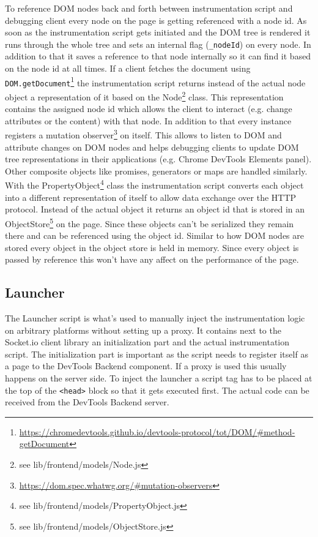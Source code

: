 To reference DOM nodes back and forth between instrumentation script and debugging client every node on the page is getting referenced with a node id. As soon as the instrumentation script gets initiated and the DOM tree is rendered it runs through the whole tree and sets an internal flag (\texttt{\_nodeId}) on every node. In addition to that it saves a reference to that node internally so it can find it based on the node id at all times. If a client fetches the document using \texttt{DOM.getDocument}\footnote{\url{https://chromedevtools.github.io/devtools-protocol/tot/DOM/\#method-getDocument}} the instrumentation script returns instead of the actual node object a representation of it based on the Node\footnote{see lib/frontend/models/Node.js} class. This representation contains the assigned node id which allows the client to interact (e.g. change attributes or the content) with that node. In addition to that every instance registers a mutation observer\footnote{\url{https://dom.spec.whatwg.org/\#mutation-observers}} on itself. This allows to listen to DOM and attribute changes on DOM nodes and helps debugging clients to update DOM tree representations in their applications (e.g. Chrome DevTools Elements panel). Other composite objects like promises, generators or maps are handled similarly. With the PropertyObject\footnote{see lib/frontend/models/PropertyObject.js} class the instrumentation script converts each object into a different representation of itself to allow data exchange over the HTTP protocol. Instead of the actual object it returns an object id that is stored in an ObjectStore\footnote{see lib/frontend/models/ObjectStore.js} on the page. Since these objects can't be serialized they remain there and can be referenced using the object id. Similar to how DOM nodes are stored every object in the object store is held in memory. Since every object is passed by reference this won't have any affect on the performance of the page.

\subsection{Launcher\label{sec:launcher}}

The Launcher script is what's used to manually inject the instrumentation logic on arbitrary platforms without setting up a proxy. It contains next to the Socket.io client library an initialization part and the actual instrumentation script. The initialization part is important as the script needs to register itself as a page to the DevTools Backend component. If a proxy is used this usually happens on the server side. To inject the launcher a script tag has to be placed at the top of the \texttt{<head>} block so that it gets executed first. The actual code can be received from the DevTools Backend server.

